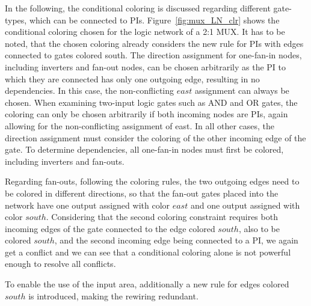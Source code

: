In the following, the conditional coloring is discussed regarding different gate-types, which can be connected to PIs. Figure~\ref{fig:mux_LN_clr} shows the conditional coloring chosen for the logic network of a 2:1 MUX. It has to be noted, that the chosen coloring already considers the new rule for PIs with edges connected to gates colored south.
The direction assignment for one-fan-in nodes, including inverters and fan-out nodes, can be chosen arbitrarily as the PI to which they are connected has only one outgoing edge, resulting in no dependencies. In this case, the non-conflicting $east$ assignment can always be chosen. When examining two-input logic gates such as AND and OR gates, the coloring can only be chosen arbitrarily if both incoming nodes are PIs, again allowing for the non-conflicting assignment of east. In all other cases, the direction assignment must consider the coloring of the other incoming edge of the gate. To determine dependencies, all one-fan-in nodes must first be colored, including inverters and fan-outs.

Regarding fan-outs, following the coloring rules, the two outgoing edges need to be colored in different directions, so that the fan-out gates placed into the network have one output assigned with color $east$ and one output assigned with color $south$. Considering that the second coloring constraint requires both incoming edges of the gate connected to the edge colored $south$, also to be colored $south$, and the second incoming edge being connected to a PI, we again get a conflict and we can see that a conditional coloring alone is not powerful enough to resolve all conflicts.

To enable the use of the input area, additionally a new rule for edges colored $south$ is introduced, making the rewiring redundant.


